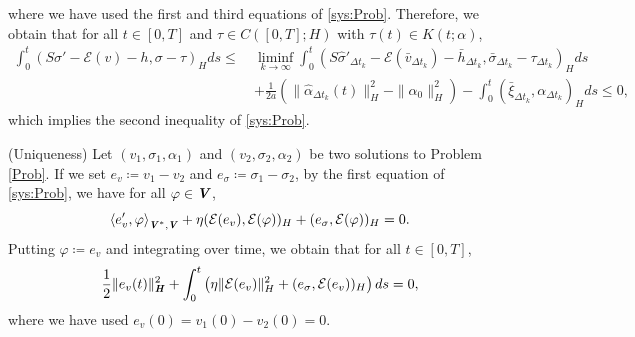 \documentclass[11pt, a4paper]{article}
\newcommand{\defeq}{\coloneqq}
\newcommand{\dt}{{\Delta t}}
\newcommand{\E}{{\mathcal{E}}}
\newcommand{\bm}[1]{\textbf{\textit{#1}}}%
\newcommand{\Hv}{{\bm{H}}}
\newcommand{\Vv}{{\bm{V}}}
\newcommand{\Hs}{{H}}
\newcommand{\blaket}[2]{ \left\langle {#1},{#2}\right\rangle_{\Vv^*,\Vv} }
\begin{document}
where we have used the first and third equations of \eqref{sys:Prob}. 
Therefore, we obtain that for all $t\in[0,T]$ and $\tau \in C([0,T];\Hs)$ with $\tau(t) \in K(t;\alpha)$,
\begin{align*}
    \int_0^t\left(S\sigma' - \E(v) - h,\sigma - \tau\right)_\Hs ds
    \le~& \liminf_{k\rightarrow\infty} 
    \int_0^t \left(S\hat{\sigma}'_{\dt_k} - \E(\bar{v}_{\dt_k}) - \bar{h}_{\dt_k}, 
    \bar{\sigma}_{\dt_k} - \tau_{\dt_k}\right)_\Hs ds\\
    &+ \frac{1}{2a}(\|\hat{\alpha}_{\dt_k}(t)\|_\Hs^2 - \|\alpha_0\|_\Hs^2)
    - \int_0^t (\bar{\xi}_{\dt_k}, \alpha_{\dt_k})_\Hs ds
    \le 0,
\end{align*}
which implies the second inequality of \eqref{sys:Prob}.

(Uniqueness) Let $(v_1, \sigma_1, \alpha_1)$ and $(v_2, \sigma_2, \alpha_2)$ be two solutions to Problem \ref{Prob}. If we set $e_v \defeq v_1-v_2$ and $e_\sigma \defeq \sigma_1-\sigma_2$, by the first equation of \eqref{sys:Prob}, we have for all $\varphi \in\Vv$,
\[
    \blaket{e'_v}{\varphi}
    + \eta (\E(e_v),\E(\varphi))_\Hs + (e_\sigma,\E(\varphi))_\Hs
    = 0.
\]
Putting $\varphi\defeq e_v$ and integrating over time, we obtain that for all $t\in[0,T]$,
\begin{align}\label{ineq:uniq1}
    \frac{1}{2}\|e_v(t)\|_\Hv^2
    + \int_0^t\left(\eta \|\E(e_v)\|_\Hs^2 + (e_\sigma,\E(e_v))_\Hs\right)ds
    = 0,
\end{align}
where we have used $e_v(0) = v_1(0) - v_2(0) = 0$.
\end{document}
